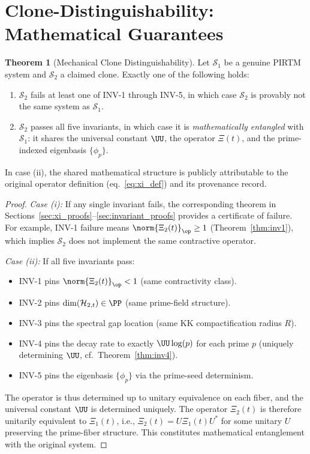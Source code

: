 \documentclass[12pt,letterpaper]{article}
\theoremstyle{definition}
\newtheorem{theorem}{Theorem}[section]
\theoremstyle{remark}
\begin{document}
\section{Clone-Distinguishability: Mathematical Guarantees}
\label{sec:clone}

\begin{theorem}[Mechanical Clone Distinguishability]
\label{thm:clone}
Let $\mathcal{S}_1$ be a genuine PIRTM system and $\mathcal{S}_2$ a claimed
clone. Exactly one of the following holds:
\begin{enumerate}[label=(\roman*)]
  \item $\mathcal{S}_2$ fails at least one of INV-1 through INV-5,
        in which case $\mathcal{S}_2$ is provably not the same system as $\mathcal{S}_1$.
  \item $\mathcal{S}_2$ passes all five invariants, in which case it is
        \emph{mathematically entangled} with $\mathcal{S}_1$: it shares the
        universal constant $\UU$, the operator $\Xi(t)$, and the prime-indexed
        eigenbasis $\{\phi_p\}$.
\end{enumerate}
In case (ii), the shared mathematical structure is publicly attributable to
the original operator definition (eq.~\eqref{eq:xi_def}) and its provenance
record.
\end{theorem}

\begin{proof}
\textit{Case (i):} If any single invariant fails, the corresponding theorem
in Sections~\ref{sec:xi_proofs}--\ref{sec:invariant_proofs} provides a
certificate of failure. For example, INV-1 failure means
$\norm{\Xi_2(t)}_\op \geq 1$ (Theorem~\ref{thm:inv1}), which implies
$\mathcal{S}_2$ does not implement the same contractive operator.

\textit{Case (ii):} If all five invariants pass:
\begin{itemize}[noitemsep]
  \item INV-1 pins $\norm{\Xi_2(t)}_\op < 1$ (same contractivity class).
  \item INV-2 pins $\dim(\mathcal{H}_{2,t}) \in \PP$ (same prime-field structure).
  \item INV-3 pins the spectral gap location (same KK compactification radius $R$).
  \item INV-4 pins the decay rate to exactly $\UU\log(p)$ for each prime $p$
        (uniquely determining $\UU$, cf.\ Theorem~\ref{thm:inv4}).
  \item INV-5 pins the eigenbasis $\{\phi_p\}$ via the prime-seed determinism.
\end{itemize}
The operator is thus determined up to unitary equivalence on each fiber,
and the universal constant $\UU$ is determined uniquely.
The operator $\Xi_2(t)$ is therefore unitarily equivalent to $\Xi_1(t)$,
i.e., $\Xi_2(t) = U\Xi_1(t)U^*$ for some unitary $U$ preserving the
prime-fiber structure. This constitutes mathematical entanglement with
the original system.
\end{proof}
\end{document}
